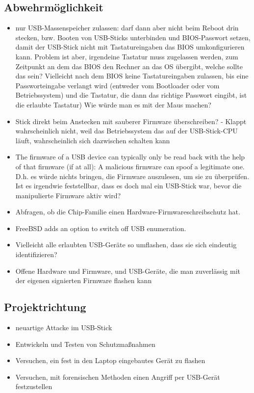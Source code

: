 \documentclass[
a4paper, %
twoside%
]{article}
\begin{document}
\subsection{Abwehrmöglichkeit}
\begin{itemize}
\item nur USB-Massenspeicher zulassen: darf dann aber nicht beim Reboot drin stecken, bzw. Booten von USB-Sticks unterbinden und BIOS-Passwort setzen, damit der USB-Stick nicht mit Tastatureingaben das BIOS umkonfigurieren kann.
Problem ist aber, irgendeine Tastatur muss zugelassen werden, zum Zeitpunkt
an dem das BIOS den Rechner an das OS übergibt, welche sollte das sein?
Vielleicht nach dem BIOS keine Tastatureingaben zulassen, bis eine Passworteingabe verlangt wird (entweder vom Bootloader oder vom Betriebssystem) und die Tastatur, die dann das richtige Passwort eingibt, ist die erlaubte Tastatur)
Wie würde man es mit der Maus machen?
\item Stick direkt beim Anstecken mit sauberer Firmware überschreiben? - Klappt
  wahrscheinlich nicht, weil das Betriebssystem das auf der USB-Stick-CPU
läuft, wahrscheinlich sich dazwischen schalten kann
\item The firmware of a USB device can typically only be read back with the help of that firmware (if at all): A malicious firmware can spoof a legitimate one. D.h. es würde nichts bringen, die Firmware auszulesen, um sie zu überprüfen.
Ist es irgendwie feststellbar, dass es doch mal ein USB-Stick war, bevor die manipulierte Firmware aktiv wird?
\item Abfragen, ob die Chip-Familie einen Hardware-Firmwareschreibschutz hat.
\item FreeBSD adds an option to switch off USB enumeration.
\item Vielleicht alle erlaubten USB-Geräte so umflashen, dass sie sich eindeutig identifizieren?
\item Offene Hardware und Firmware, und USB-Geräte, die man zuverlässig mit der eigenen signierten Firmware flashen kann
\end{itemize}


\subsection{Projektrichtung}
\begin{itemize}
\item neuartige Attacke im USB-Stick
\item Entwickeln und Testen von Schutzmaßnahmen
\item Versuchen, ein fest in den Laptop eingebautes Gerät zu flashen
\item Versuchen, mit forensischen Methoden einen Angriff per USB-Gerät
  festzustellen
\end{itemize}
\end{document}
